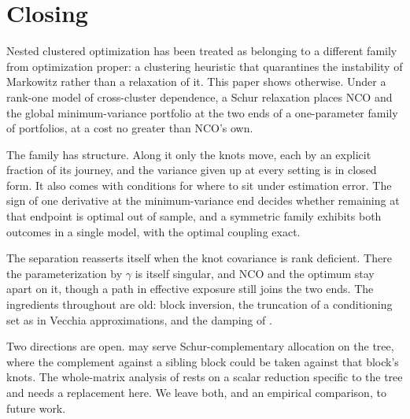 \documentclass[11pt]{article}
\begin{document}
\section{Closing}

Nested clustered optimization has been treated as belonging to a different
family from optimization proper: a clustering heuristic that quarantines the
instability of Markowitz rather than a relaxation of it. This paper shows
otherwise. Under a rank-one model of cross-cluster dependence, a Schur
relaxation places NCO and the global minimum-variance portfolio at the two
ends of a one-parameter family of portfolios, at a cost no greater than
NCO's own.

The family has structure. Along it only the knots move, each by an explicit
fraction of its journey, and the variance given up at every setting is in
closed form. It also comes with conditions for where to sit under
estimation error. The sign of one derivative at the minimum-variance end
decides whether remaining at that endpoint is optimal out of sample, and a
symmetric family exhibits both outcomes in a single model, with the optimal
coupling exact.

The separation reasserts itself when the knot covariance is rank deficient.
There the parameterization by $\gamma$ is itself singular, and NCO and the
optimum stay apart on it, though a path in effective exposure still joins
the two ends. The ingredients throughout are old: block inversion, the
truncation of a conditioning set as in Vecchia approximations, and the
damping of \cite{cotton2024schur}.

Two directions are open.  may serve
Schur-complementary allocation on the tree, where the complement against a
sibling block could be taken against that block's knots. The whole-matrix
analysis of \cite{cotton2026bridge} rests on a scalar reduction specific to
the tree and needs a replacement here. We leave both, and an empirical
comparison, to future work.
\end{document}
